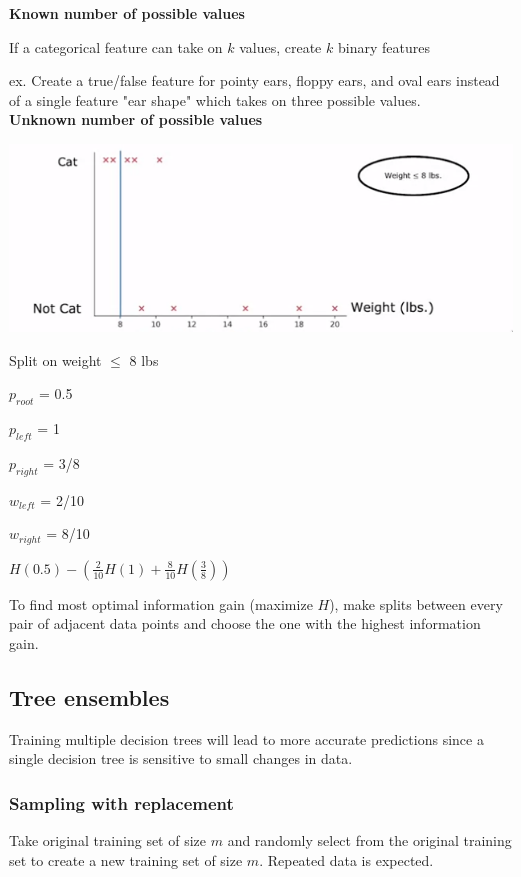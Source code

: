 \documentclass[12pt]{article}
\begin{document}
\textbf{Known number of possible values}

If a categorical feature can take on $k$ values, create $k$ binary features

ex. Create a true/false feature for pointy ears, floppy ears, and oval ears instead of a single
feature "ear shape" which takes on three possible values.\\

\textbf{Unknown number of possible values}

\includegraphics[scale=.7]{continuous-tree}

Split on weight $\le$ 8 lbs

$p_{root}$ = 0.5

$p_{left}$ = 1

$p_{right}$ = 3/8

$w_{left}$ = 2/10

$w_{right}$ = 8/10

$H(0.5) - (\frac{2}{10} H(1) + \frac{8}{10} H(\frac{3}{8}))$

To find most optimal information gain (maximize $H$), make splits between every pair of adjacent data points and choose
the one with the highest information gain.

\subsection{Tree ensembles}

Training multiple decision trees will lead to more accurate predictions since
a single decision tree is sensitive to small changes in data.

\subsubsection{Sampling with replacement}

Take original training set of size $m$ and randomly select from the original training set to
create a new training set of size $m$. Repeated data is expected.
\end{document}
